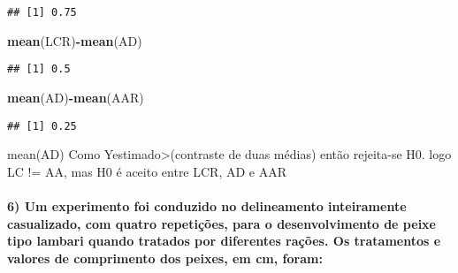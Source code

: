 \documentclass[
]{article}
\newenvironment{Shaded}{\begin{snugshade}}{\end{snugshade}}
\newcommand{\FunctionTok}[1]{\textcolor[rgb]{0.13,0.29,0.53}{\textbf{#1}}}
\newcommand{\NormalTok}[1]{#1}
\newcommand{\SpecialCharTok}[1]{\textcolor[rgb]{0.81,0.36,0.00}{\textbf{#1}}}
\begin{document}
\begin{verbatim}
## [1] 0.75
\end{verbatim}

\begin{Shaded}
\begin{Highlighting}[]
\FunctionTok{mean}\NormalTok{(LCR)}\SpecialCharTok{{-}}\FunctionTok{mean}\NormalTok{(AD)}
\end{Highlighting}
\end{Shaded}

\begin{verbatim}
## [1] 0.5
\end{verbatim}

\begin{Shaded}
\begin{Highlighting}[]
\FunctionTok{mean}\NormalTok{(AD)}\SpecialCharTok{{-}}\FunctionTok{mean}\NormalTok{(AAR)}
\end{Highlighting}
\end{Shaded}

\begin{verbatim}
## [1] 0.25
\end{verbatim}

mean(AD) Como Yestimado\textgreater(contraste de duas médias) então
rejeita-se H0. logo LC != AA, mas H0 é aceito entre LCR, AD e AAR

\hypertarget{um-experimento-foi-conduzido-no-delineamento-inteiramente-casualizado-com-quatro-repetiuxe7uxf5es-para-o-desenvolvimento-de-peixe-tipo-lambari-quando-tratados-por-diferentes-rauxe7uxf5es.-os-tratamentos-e-valores-de-comprimento-dos-peixes-em-cm-foram}{%
\paragraph{6) Um experimento foi conduzido no delineamento inteiramente
casualizado, com quatro repetições, para o desenvolvimento de peixe tipo
lambari quando tratados por diferentes rações. Os tratamentos e valores
de comprimento dos peixes, em cm,
foram:}\label{um-experimento-foi-conduzido-no-delineamento-inteiramente-casualizado-com-quatro-repetiuxe7uxf5es-para-o-desenvolvimento-de-peixe-tipo-lambari-quando-tratados-por-diferentes-rauxe7uxf5es.-os-tratamentos-e-valores-de-comprimento-dos-peixes-em-cm-foram}}
\end{document}
